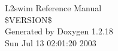 \documentclass[a4paper]{book}
\begin{document}
\begin{titlepage}
\vspace*{7cm}
\begin{center}
{\Large L2swim Reference Manual\\[1ex]\large \$VERSION\$}\\
\vspace*{1cm}
{\large Generated by Doxygen 1.2.18}\\
\vspace*{0.5cm}
{\small Sun Jul 13 02:01:20 2003}\\
\end{center}
\end{titlepage}
\clearemptydoublepage
{}
\tableofcontents
\clearemptydoublepage
{}
\printindex
\end{document}
